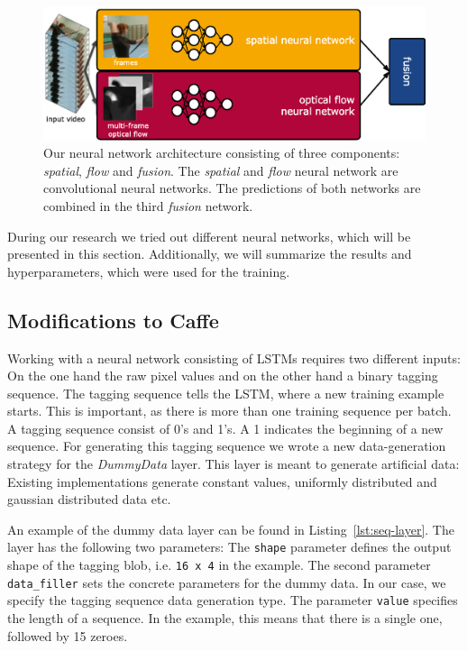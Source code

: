 \begin{figure}[!htb]
	\centering
	\includegraphics[scale=.7]{images/net_architecture.eps}
	\caption{Our neural network architecture consisting of three components: \emph{spatial}, \emph{flow} and \emph{fusion}. The \emph{spatial} and \emph{flow} neural network are convolutional neural networks. The predictions of both networks are combined in the third \emph{fusion} network.}
	\label{fig:architecture}
\end{figure}

During our research we tried out different neural networks, which will be presented in this section.
Additionally, we will summarize the results and hyperparameters, which were used for the training.

\subsection{Modifications to Caffe}

Working with a neural network consisting of LSTMs requires two different inputs:
On the one hand the raw pixel values and on the other hand a binary tagging sequence.
The tagging sequence tells the LSTM, where a new training example starts.
This is important, as there is more than one training sequence per batch.
A tagging sequence consist of 0's and 1's.
A 1 indicates the beginning of a new sequence.
For generating this tagging sequence we wrote a new data-generation strategy for the \emph{DummyData} layer.
This layer is meant to generate artificial data: Existing implementations generate constant values, uniformly distributed and gaussian distributed data etc.

An example of the dummy data layer can be found in Listing~\ref{lst:seq-layer}.
The layer has the following two parameters:
The \texttt{shape} parameter defines the output shape of the tagging blob, i.e. \texttt{16 x 4} in the example.
The second parameter \texttt{data\_filler} sets the concrete parameters for the dummy data.
In our case, we specify the tagging sequence data generation type.
The parameter \texttt{value} specifies the length of a sequence.
In the example, this means that there is a single one, followed by 15 zeroes.

